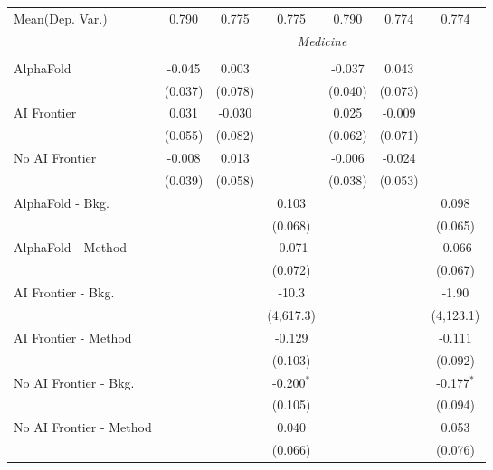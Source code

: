 \begin{tabular}{lcccccc}
Mean(Dep. Var.) & 0.790 & 0.775 & 0.775 & 0.790 & 0.774 & 0.774 \\
 & \multicolumn{6}{c}{\textit{Medicine}} \\ \\
   AlphaFold               & -0.045  & 0.003   &              & -0.037  & 0.043   &   \\   
                           & (0.037) & (0.078) &              & (0.040) & (0.073) &   \\   
   AI Frontier             & 0.031   & -0.030  &              & 0.025   & -0.009  &   \\   
                           & (0.055) & (0.082) &              & (0.062) & (0.071) &   \\   
   No AI Frontier          & -0.008  & 0.013   &              & -0.006  & -0.024  &   \\   
                           & (0.039) & (0.058) &              & (0.038) & (0.053) &   \\   
   AlphaFold - Bkg.        &         &         & 0.103        &         &         & 0.098\\   
                           &         &         & (0.068)      &         &         & (0.065)\\   
   AlphaFold - Method      &         &         & -0.071       &         &         & -0.066\\   
                           &         &         & (0.072)      &         &         & (0.067)\\   
   AI Frontier - Bkg.      &         &         & -10.3        &         &         & -1.90\\   
                           &         &         & (4,617.3)    &         &         & (4,123.1)\\   
   AI Frontier - Method    &         &         & -0.129       &         &         & -0.111\\   
                           &         &         & (0.103)      &         &         & (0.092)\\   
   No AI Frontier - Bkg.   &         &         & -0.200$^{*}$ &         &         & -0.177$^{*}$\\   
                           &         &         & (0.105)      &         &         & (0.094)\\   
   No AI Frontier - Method &         &         & 0.040        &         &         & 0.053\\   
                           &         &         & (0.066)      &         &         & (0.076)\\   

\end{tabular}
